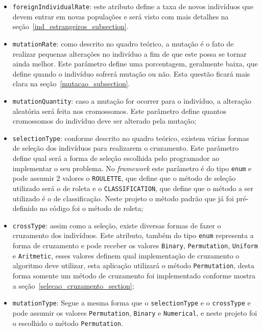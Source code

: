 \begin{itemize}
\begin{itemize}
		\item \texttt{foreignIndividualRate}:
		este atributo define a taxa de novos indivíduos que devem entrar em novas
		populações e será visto com mais detalhes na seção~\ref{ind_estrangeiros_subsection}.
		
		\item \texttt{mutationRate}:
		como descrito no quadro teórico, a mutação é o fato de realizar pequenas
		alterações no indivíduo a fim de que este possa se tornar ainda melhor. Este parâmetro define uma porcentagem, geralmente baixa, que define quando o indivíduo sofrerá mutação ou não. Esta questão ficará mais clara na seção~\ref{mutacao_subsection}.
		
		\item \texttt{mutationQuantity}:
		caso a mutação for ocorrer para o indivíduo, a alteração aleatória será feita
		nos cromossomos.
		Este parâmetro define quantos cromossomos do indivíduo deve ser alterado pela mutação;
		
		\item \texttt{selectionType}:
		conforme descrito no quadro teórico, existem várias formas de seleção dos
		indivíduos para realizarem o cruzamento. Este parâmetro define qual será a forma de seleção escolhida pelo programador ao
		implementar o seu problema. No \textit{framework} este parâmetro é do tipo \texttt{enum} e pode assumir 2 valores o
		\texttt{ROULETTE}, que define que o método de seleção utilizado será o de roleta e o \texttt{CLASSIFICATION}, que 
		define que o método a ser utilizado é o de classificação. Neste projeto o
		método padrão que já foi pré-definido no código foi o método de roleta;
		
		\item \texttt{crossType}:
		assim como a seleção, existe diversas formas de fazer o cruzamento dos indivíduos. Este atributo, 
		também do tipo \texttt{enum} representa a forma de cruzamento e pode receber os valores \texttt{Binary}, 
		\texttt{Permutation}, \texttt{Uniform} e \texttt{Aritmetic}, esses valores
		definem qual implementação de cruzamento o algoritmo deve utilizar, esta aplicação
		utilizará o método \texttt{Permutation}, desta forma somente um método de cruzamento foi implementado conforme 
		mostra a seção~\ref{selecao_cruzamento_section};
		
		\item \texttt{mutationType}:
		Segue a mesma forma que o \texttt{selectionType} e o \texttt{crossType} e pode assumir os valores \texttt{Permutation}, 
		\texttt{Binary} e \texttt{Numerical}, e neste projeto foi o escolhido o
		método \texttt{Permutation}.
		

\end{itemize}
\end{itemize}
